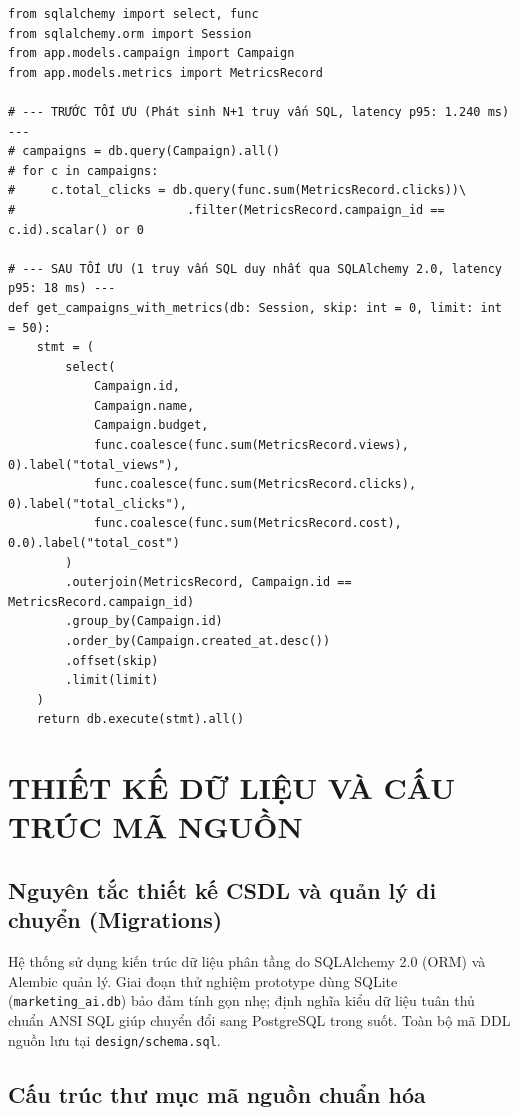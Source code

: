 \begin{footnotesize}
\begin{verbatim}
from sqlalchemy import select, func
from sqlalchemy.orm import Session
from app.models.campaign import Campaign
from app.models.metrics import MetricsRecord

# --- TRƯỚC TỐI ƯU (Phát sinh N+1 truy vấn SQL, latency p95: 1.240 ms) ---
# campaigns = db.query(Campaign).all()
# for c in campaigns:
#     c.total_clicks = db.query(func.sum(MetricsRecord.clicks))\
#                        .filter(MetricsRecord.campaign_id == c.id).scalar() or 0

# --- SAU TỐI ƯU (1 truy vấn SQL duy nhất qua SQLAlchemy 2.0, latency p95: 18 ms) ---
def get_campaigns_with_metrics(db: Session, skip: int = 0, limit: int = 50):
    stmt = (
        select(
            Campaign.id,
            Campaign.name,
            Campaign.budget,
            func.coalesce(func.sum(MetricsRecord.views), 0).label("total_views"),
            func.coalesce(func.sum(MetricsRecord.clicks), 0).label("total_clicks"),
            func.coalesce(func.sum(MetricsRecord.cost), 0.0).label("total_cost")
        )
        .outerjoin(MetricsRecord, Campaign.id == MetricsRecord.campaign_id)
        .group_by(Campaign.id)
        .order_by(Campaign.created_at.desc())
        .offset(skip)
        .limit(limit)
    )
    return db.execute(stmt).all()
\end{verbatim}
\end{footnotesize}

\chapter{THIẾT KẾ DỮ LIỆU VÀ CẤU TRÚC MÃ NGUỒN}

\section{Nguyên tắc thiết kế CSDL và quản lý di chuyển (Migrations)}

Hệ thống sử dụng kiến trúc dữ liệu phân tầng do SQLAlchemy 2.0 (ORM) và Alembic quản lý. Giai đoạn thử nghiệm prototype dùng SQLite (\texttt{marketing\_ai.db}) bảo đảm tính gọn nhẹ; định nghĩa kiểu dữ liệu tuân thủ chuẩn ANSI SQL giúp chuyển đổi sang PostgreSQL trong suốt. Toàn bộ mã DDL nguồn lưu tại \texttt{design/schema.sql}.

\section{Cấu trúc thư mục mã nguồn chuẩn hóa}

